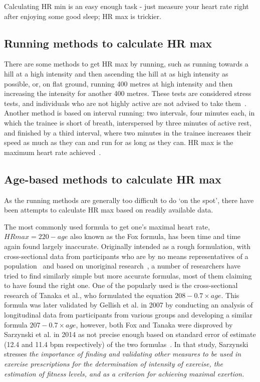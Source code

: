 Calculating HR min is an easy enough task - just measure your heart rate right after enjoying some good sleep; HR max is trickier.

\subsection*{Running methods to calculate HR max}
There are some methods to get HR max by running, such as running towards a hill at a high intensity and then ascending the hill at as high intensity as possible,
or, on flat ground, running 400 metres at high intensity and then increasing the intensity for another 400 metres.
These tests are considered stress tests, and individuals who are not highly active are not advised to take them~\cite{hrmax-running-tests}.
Another method is based on interval running:
two intervals, four minutes each, in which the trainee is short of breath, interspersed by three minutes of active rest, and finished by a third interval, where two minutes in the trainee increases their speed as much as they can and run for as long as they can.
HR max is the maximum heart rate achieved~\cite{hrmax-running-tests-intervals}.

\subsection*{Age-based methods to calculate HR max}
As the running methods are generally too difficult to do `on the spot', there have been attempts to calculate HR max based on readily available data.

The most commonly used formula to get one's maximal heart rate,\linebreak $HRmax=220-age$ also known as the Fox formula, has been time and time again found largely inaccurate.
Originally intended as a rough formulation, with cross-sectional data from participants who are by no means representatives of a population~\cite{220-hrmax-new-formula} and based on unoriginal research~\cite{220-hrmax-disproved},
a number of researchers have tried to find similarly simple but more accurate formulas, most of them claiming to have found the right one.
One of the popularly used is the cross-sectional research of Tanaka et al., who formulated the equation $208-0.7\times age$.
This formula was later validated by Gellish et al. in 2007 by conducting an analysis of longitudinal data from participants from various groups and developing a similar formula $207-0.7\times age$,
however, both Fox and Tanaka were disproved by Sarzynski et al. in 2014 as not precise enough based on standard error of estimate (12.4 and 11.4 bpm respectively) of the two formulas~\cite{hrmax-age-disproved}.
In that study, Sarzynski stresses \textit{the importance of finding and validating other measures to be used in exercise prescriptions for the determination of intensity of exercise, the estimation of fitness levels, and as a criterion for achieving maximal exertion.}

